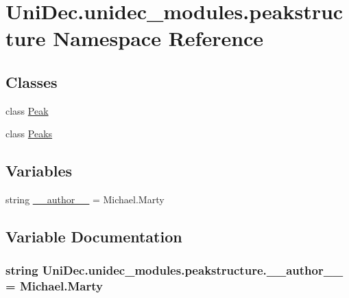 \hypertarget{namespace_uni_dec_1_1unidec__modules_1_1peakstructure}{}\section{Uni\+Dec.\+unidec\+\_\+modules.\+peakstructure Namespace Reference}
\label{namespace_uni_dec_1_1unidec__modules_1_1peakstructure}
\subsection*{Classes}
\begin{DoxyCompactItemize}
\item 
class \hyperlink{class_uni_dec_1_1unidec__modules_1_1peakstructure_1_1_peak}{Peak}
\item 
class \hyperlink{class_uni_dec_1_1unidec__modules_1_1peakstructure_1_1_peaks}{Peaks}
\end{DoxyCompactItemize}
\subsection*{Variables}
\begin{DoxyCompactItemize}
\item 
string \hyperlink{namespace_uni_dec_1_1unidec__modules_1_1peakstructure_a59117559688f1edf8fb3d8f74d2d3334}{\+\_\+\+\_\+author\+\_\+\+\_\+} = \textquotesingle{}Michael.\+Marty\textquotesingle{}
\end{DoxyCompactItemize}


\subsection{Variable Documentation}
\hypertarget{namespace_uni_dec_1_1unidec__modules_1_1peakstructure_a59117559688f1edf8fb3d8f74d2d3334}{}
\subsubsection[{\+\_\+\+\_\+author\+\_\+\+\_\+}]{\setlength{\rightskip}{0pt plus 5cm}string Uni\+Dec.\+unidec\+\_\+modules.\+peakstructure.\+\_\+\+\_\+author\+\_\+\+\_\+ = \textquotesingle{}Michael.\+Marty\textquotesingle{}}\label{namespace_uni_dec_1_1unidec__modules_1_1peakstructure_a59117559688f1edf8fb3d8f74d2d3334}
